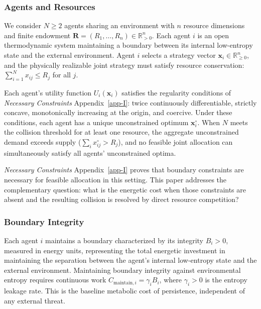 \documentclass[11pt]{article}
\theoremstyle{plain}
\theoremstyle{definition}
\theoremstyle{remark}
\let\origsubsubsection\subsubsection
\renewcommand{\subsubsection}{\needspace{4\baselineskip}\origsubsubsection}
\begin{document}
\subsubsection{Agents and Resources}\label{agents-and-resources}

We consider \(N \geq 2\) agents sharing an environment with \(n\)
resource dimensions and finite endowment
\(\mathbf{R} = (R_1, \ldots, R_n) \in \mathbb{R}_{>0}^n\). Each agent
\(i\) is an open thermodynamic system maintaining a boundary between its
internal low-entropy state and the external environment. Agent \(i\)
selects a strategy vector \(\mathbf{x}_i \in \mathbb{R}_{\geq 0}^n\),
and the physically realizable joint strategy must satisfy resource
conservation: \(\sum_{i=1}^N x_{ij} \leq R_j\) for all \(j\).

Each agent's utility function \(U_i(\mathbf{x}_i)\) satisfies the
regularity conditions of \emph{Necessary Constraints}
Appendix~\ref{app-I}: twice continuously differentiable, strictly
concave, monotonically increasing at the origin, and coercive. Under
these conditions, each agent has a unique unconstrained optimum
\(\mathbf{x}_i^{\circ}\). When \(N\) meets the collision threshold for
at least one resource, the aggregate unconstrained demand exceeds supply
(\(\sum_i x_{ij}^{\circ} > R_j\)), and no feasible joint allocation can
simultaneously satisfy all agents' unconstrained optima.

\emph{Necessary Constraints} Appendix~\ref{app-I} proves that boundary
constraints are necessary for feasible allocation in this setting. This
paper addresses the complementary question: what is the energetic cost
when those constraints are absent and the resulting collision is
resolved by direct resource competition?

\subsubsection{Boundary Integrity}\label{boundary-integrity}

Each agent \(i\) maintains a boundary characterized by its integrity
\(B_i > 0\), measured in energy units, representing the total energetic
investment in maintaining the separation between the agent's internal
low-entropy state and the external environment. Maintaining boundary
integrity against environmental entropy requires continuous work
\(C_{\text{maintain},i} = \gamma_i B_i\), where \(\gamma_i > 0\) is the
entropy leakage rate. This is the baseline metabolic cost of
persistence, independent of any external threat.
\end{document}
